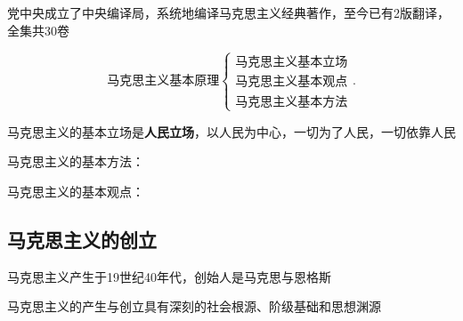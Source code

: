 党中央成立了中央编译局，系统地编译马克思主义经典著作，至今已有2版翻译，全集共30卷

\[
    \mbox{马克思主义基本原理}
    \begin{cases}
        \mbox{马克思主义基本立场}\\ 
        \mbox{马克思主义基本观点}\\ 
        \mbox{马克思主义基本方法}
    \end{cases}
.\] 
\begin{notation}
    马克思主义的基本立场是\textbf{人民立场}，以人民为中心，一切为了人民，一切依靠人民
\end{notation}
\begin{notation}
    马克思主义的基本方法：
\end{notation}
\begin{notation}
    马克思主义的基本观点：
\end{notation}

\subsection{马克思主义的创立}%
\label{sub:马克思主义的创立}
马克思主义产生于19世纪40年代，创始人是马克思与恩格斯

马克思主义的产生与创立具有深刻的社会根源、阶级基础和思想渊源

